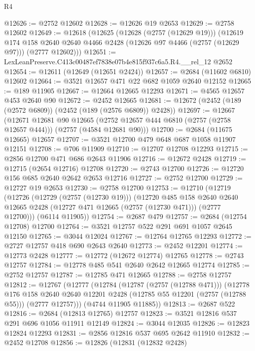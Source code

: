 \begin{lexlean}{R4}
\begin{coremodule}
@12626 := @2752 @12602
@12628 := @12626 @19 @2653
@12629 := @2758 @12602
@12649 := @12618
    (@12625
      (@12628 (@2757 (@12629 @19)))
      (@12619
        @174
        @158
        @2640
        @2640
        @4466
        @2428
        (@12626 @97 @4466 (@2757 (@12629 @97)))
        (@2777 @12602)))
@12651 := LexLeanPreserve.C413c00487ef7838e07b4e815f937c6a5.R4.__rel_12 @2652
@12654 := @12611 (@12649 (@12651 @2424))
@12657 := @2684 (@11602 @6810) @12602
@12664 := @3521 @12657 @471 @22 @682 @1059 @2640 @12152
@12665 := @189 @11905
@12667 := @12664 @12665 @12293
@12671 := @4565 @12657 @453 @2640 @90
@12672 := @2452 @12665
@12681 := @12672 (@2452 (@189 (@2572 @6809)) (@2452 (@189 (@2576 @6809)) @2428))
@12697 := @12667
    (@12671
      @12681
      @90
      @12665
      (@2752 @12657 @444 @6810 (@2757 (@2758 @12657 @444)))
      (@2757 (@4584 @12681 @90)))
@12700 := @2684 (@11675 @12665) @12657
@12707 := @3521 @12700 @479 @648 @687 @1058 @11907 @12151
@12708 := @706 @11909
@12710 := @12707 @12708 @12293
@12715 := @2856 @12700 @471 @686 @2643 @11906
@12716 := @12672 @2428
@12719 := @12715 (@2654 @12716) @12708
@12720 := @2743 @12700
@12726 := @12720 @156 @685 @2640 @2642 @2653 @12716
@12727 := @2752 @12700
@12729 := @12727 @19 @2653
@12730 := @2758 @12700
@12753 := @12710
    (@12719
      (@12726
        (@12729 (@2757 (@12730 @19)))
        (@12720
          @485
          @158
          @2640
          @2640
          @12665
          @2428
          (@12727 @471 @12665 (@2757 (@12730 @471)))
          (@2777 @12700)))
      (@6114 @11905))
@12754 := @2687 @479
@12757 := @2684 (@12754 @12708) @12700
@12764 := @3521 @12757 @522 @291 @691 @1057 @2645 @12150
@12765 := @3044 @12024
@12767 := @12764 @12765 @12293
@12772 := @2727 @12757 @418 @690 @2643 @2640
@12773 := @2452 @12201
@12774 := @12773 @2428
@12777 := @12772 (@12672 @12774) @12765
@12778 := @2743 @12757
@12784 := @12778 @485 @541 @2640 @2642 @12665 @12774
@12785 := @2752 @12757
@12787 := @12785 @471 @12665
@12788 := @2758 @12757
@12812 := @12767
    (@12777
      (@12784
        (@12787 (@2757 (@12788 @471)))
        (@12778
          @176
          @158
          @2640
          @2640
          @12201
          @2428
          (@12785 @55 @12201 (@2757 (@12788 @55)))
          (@2777 @12757)))
      (@4744 @11905 @11885))
@12813 := @2687 @522
@12816 := @2684 (@12813 @12765) @12757
@12823 := @3521 @12816 @537 @291 @696 @1056 @11911 @12149
@12824 := @3044 @12035
@12826 := @12823 @12824 @12293
@12831 := @2856 @12816 @537 @695 @2642 @11910
@12832 := @2452 @12708
@12856 := @12826
    (@12831
      (@12832 @2428)

\end{coremodule}
\end{lexlean}
